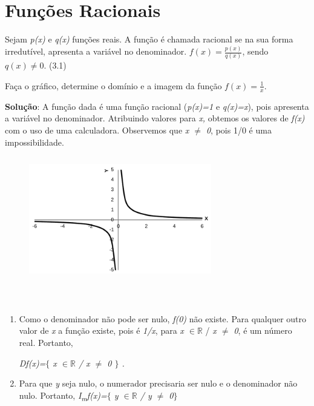 \section{Funções Racionais}
 
\begin{caixa}
	\begin{tdefinicao}
		Sejam \textit{p(x)} e \textit{q(x)} funções reais. A função é chamada racional se na sua forma irredutível, apresenta a variável no denominador. 
		\( f \left( x \right) =\frac{p \left( x \right) }{q \left( x \right) } \), sendo \(  q \left( x \right)  \neq 0. \) \quad \quad \quad \quad \quad (3.1)
	\end{tdefinicao}
\end{caixa}
\begin{texemplo}

Faça o gráfico, determine o domínio e a imagem da função  \( f \left( x \right) =\frac{1}{x} \).

\textbf{Solução}: A função dada é uma função racional (\textit{p(x)=1} e \textit{q(x)=x}), pois apresenta a variável no denominador. Atribuindo valores para \textit{x,} obtemos os valores de \textit{f(x)} com o uso de uma calculadora. Observemos que \textit{x $ \neq $  0}, pois 1/0 é uma impossibilidade.

\begin{figure}[H]
	\begin{Center}
		\includegraphics[width=3.14in,height=2.14in]{capitulos/outras_funcoes/media/image10.pdf}
	\end{Center}
\end{figure}

~~

\begin{enumerate}[label=(\roman*)]
	\item Como o denominador não pode ser nulo, \textit{f(0)} não existe. Para qualquer outro valor de \textit{x} a função existe, pois é \textit{1/x}, para \textit{x $ \in \mathbb{R} $  } / \textit{x $ \neq $  0}, é um número real. Portanto,  

\quad \quad \quad \textit{Df(x)=$ \{ $  x $ \in \mathbb{R} $  \textbf{ }/ x $ \neq $  0\textbf{ }$ \} $ .}

	\item Para que \textit{y} seja nulo, o numerador precisaria ser nulo e o denominador não nulo. Portanto, \textit{I\textsubscript{m}f(x)=$ \{ $ y $ \in \mathbb{R} $   / y $ \neq $  0$ \} $  }\qedsymbol{} 
\end{enumerate}

\end{texemplo}
